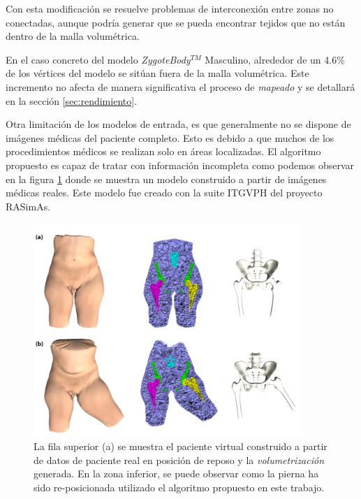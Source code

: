 %





%


Con esta modificación se resuelve problemas de interconexión entre zonas no conectadas, aunque podría generar que se pueda encontrar tejidos que no están dentro de la malla volumétrica. %

En el caso concreto del modelo \emph{ZygoteBody}$^{TM}$ Masculino, alrededor de un 4.6\% de los vértices del modelo se sitúan fuera de la malla volumétrica. 
Este incremento no afecta de manera significativa el proceso de \emph{mapeado} y se detallará en la sección  \ref{sec:rendimiento}.

Otra limitación de los modelos de entrada, es que generalmente no se dispone de imágenes médicas del paciente completo. Esto es debido a que muchos de los procedimientos médicos se realizan solo en áreas localizadas.
El algoritmo propuesto es capaz de tratar con información incompleta como podemos observar en la figura \ref{fig:patient} donde se muestra un modelo construido a partir de imágenes médicas reales. Este modelo fue creado con la suite \ac{ITGVPH} del proyecto \ac{RASimAs}.

\begin{figure}[ht]
   \centering
    \includegraphics[width=0.9\textwidth]{IMG/patient.png}
    \caption{La fila superior (a) se muestra el paciente virtual construido a partir de datos de paciente real en posición de reposo y la \emph{volumetrización} generada. En la zona inferior, se puede observar como la pierna ha sido re-posicionada utilizado el algoritmo propuesto en este trabajo.
    }
   \label{fig:patient}
\end{figure}


